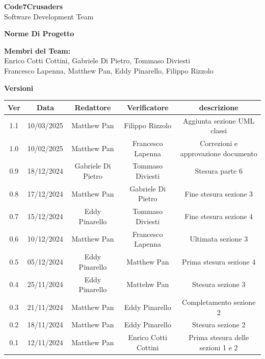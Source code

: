 \documentclass{article}
\begin{document}
\begin{titlepage}
    \vspace{1cm}
    
    {\Huge \textbf{Code7Crusaders}}\\
    \vspace{0.5cm}
    {\Large Software Development Team}\\
    \vspace{2cm}
    
    \large \textbf{Norme Di Progetto}
    \vspace{3.9cm}

    \textbf{Membri del Team:}\\
    Enrico Cotti Cottini, Gabriele Di Pietro, Tommaso Diviesti \\
    Francesco Lapenna, Matthew Pan, Eddy Pinarello, Filippo Rizzolo \\
    \vspace{0.5cm}
    
    \vspace{1cm}
\end{titlepage}



\newpage
\begin{center}
    \textbf{Versioni}
    \\
    \vspace{0.3cm}
    \begin{tabular}{|c|c|c|c|c|}
        \hline
        \textbf{Ver} & \textbf{Data} & \textbf{Redattore} & \textbf{Verificatore} & \textbf{descrizione}\\
        \hline
        1.1 & 10/03/2025 & Matthew Pan & Filippo Rizzolo & Aggiunta sezione UML classi \\
        1.0 & 10/02/2025 & Matthew Pan & Francesco Lapenna & Correzioni e approvazione documento \\ 
        0.9 & 18/12/2024 & Gabriele Di Pietro & Tommaso Diviesti & Stesura parte 6 \\ 
        0.8 & 17/12/2024 & Matthew Pan &   Gabriele Di Pietro & Fine stesura sezione 3\\
        0.7 & 15/12/2024 & Eddy Pinarello & Tommaso Diviesti & Fine stesura sezione 4\\
        0.6 & 10/12/2024 & Matthew Pan & Francesco Lapenna & Ultimata sezione 3\\
        0.5 & 05/12/2024 & Eddy Pinarello & Matthew Pan       & Prima stesura sezione 4\\
        0.4 & 25/11/2024 & Eddy Pinarello & Mattehw Pan       & Stesura sezione 3\\
        0.3 & 21/11/2024 & Matthew Pan &    Eddy Pinarello    & Completamento sezione 2\\
        0.2 & 18/11/2024 & Matthew Pan &    Eddy Pinarello    & Stesura sezione 2\\
        0.1 & 12/11/2024 & Matthew Pan & Enrico Cotti Cottini & Prima stesura delle sezioni 1 e 2\\
        \hline
    \end{tabular}
\end{center}
\end{document}
